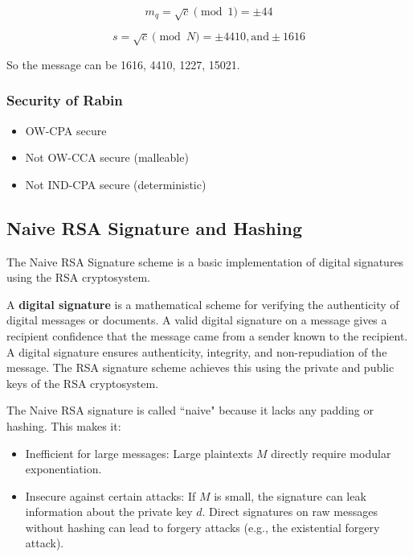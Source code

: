 \[ m_q = \sqrt{c} \pmod{1} = \pm 44\]

\[ s = \sqrt{c} \pmod{N} = \pm 4410 , \text{and} \pm 1616\]

So the message can be 1616, 4410, 1227, 15021.

\subsubsection{Security of Rabin}
\begin{itemize}
    \item OW-CPA secure
    \item Not OW-CCA secure (malleable)
    \item Not IND-CPA secure (deterministic)
\end{itemize}



\subsection{Naive RSA Signature and Hashing}
The Naive RSA Signature scheme is a basic implementation of digital signatures using the RSA cryptosystem.

\begin{defn}
A \textbf{digital signature} is a mathematical scheme for verifying the authenticity of digital messages or documents. A valid digital signature on a message gives a recipient confidence that the message came from a sender known to the recipient.
A digital signature ensures authenticity, integrity, and non-repudiation of the message.
The RSA signature scheme achieves this using the private and public keys of the RSA cryptosystem.
\end{defn}

The Naive RSA signature is called ``naive" because it lacks any padding or hashing. This makes it:
\begin{itemize}
    \item Inefficient for large messages: Large plaintexts $M$ directly require modular exponentiation.
    \item Insecure against certain attacks: If $M$ is small, the signature can leak information about the private key $d$.
Direct signatures on raw messages without hashing can lead to forgery attacks (e.g., the existential forgery attack).
\end{itemize}

